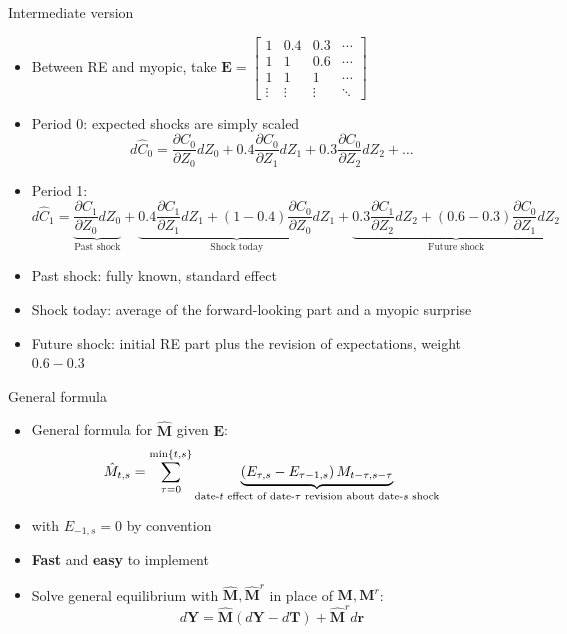 \documentclass[10pt,english]{beamer}
\begin{document}
%
\begin{frame}{Intermediate version}
\vspace{-1mm}
\begin{itemize}
\item <+->Between RE and myopic, take $\boldsymbol{E}=\begin{bmatrix}1 & 0.4 & 0.3 & \cdots\\
1 & 1 & 0.6 & \cdots\\
1 & 1 & 1 & \cdots\\
\vdots & \vdots & \vdots & \ddots
\end{bmatrix}$
\item <+->Period 0: expected shocks are simply scaled
\[
d\hat{C}_{0}=\frac{\partial C_{0}}{\partial Z_{0}}dZ_{0}+0.4\frac{\partial C_{0}}{\partial Z_{1}}dZ_{1}+0.3\frac{\partial C_{0}}{\partial Z_{2}}dZ_{2}+\ldots
\]
\item <+->Period 1: {\footnotesize
\[
d\hat{C}_{1}=\underbrace{\frac{\partial C_{1}}{\partial Z_{0}}dZ_{0}}_{\text{Past shock}}+\underbrace{0.4\frac{\partial C_{1}}{\partial Z_{1}}dZ_{1}+\left(1-0.4\right)\frac{\partial C_{0}}{\partial Z_{0}}dZ_{1}}_{\text{Shock today}}+\underbrace{0.3\frac{\partial C_{1}}{\partial Z_{2}}dZ_{2}+\left(0.6-0.3\right)\frac{\partial C_{0}}{\partial Z_{1}}dZ_{2}}_{\text{Future shock}}
\]
}{\footnotesize\par}
\item <+->Past shock: fully known, standard effect
\item <+->Shock today: average of the forward-looking part and a myopic surprise
\item <+->Future shock: initial RE part plus the revision of expectations, weight $0.6-0.3$
\end{itemize}
\end{frame}
%
\begin{frame}{General formula}
\begin{itemize}
\item <+->General formula for $\hat{\boldsymbol{M}}$ given $\boldsymbol{E}$:
\[
\hat{M}_{t,s}=\sum_{\tau=0}^{\min\left\{ t,s\right\} }\underbrace{\left(E_{\tau,s}-E_{\tau-1,s}\right)M_{t-\tau,s-\tau}}_{\text{date-\ensuremath{t} effect of date-\ensuremath{\tau} revision about date-\ensuremath{s} shock}}
\]
\item <+->with $E_{-1,s}=0$ by convention
\item <+->\textbf{Fast} and \textbf{easy} to implement
\item <+->Solve general equilibrium with $\hat{\boldsymbol{M}},\hat{\boldsymbol{M}}^{r}$ in place of $\boldsymbol{M},\boldsymbol{M}^{r}$:
\[
d\boldsymbol{Y}=\hat{\boldsymbol{M}}\left(d\boldsymbol{Y}-d\boldsymbol{T}\right)+\hat{\boldsymbol{M}}^{r}d\boldsymbol{r}
\]
\end{itemize}
\end{frame}
\end{document}

